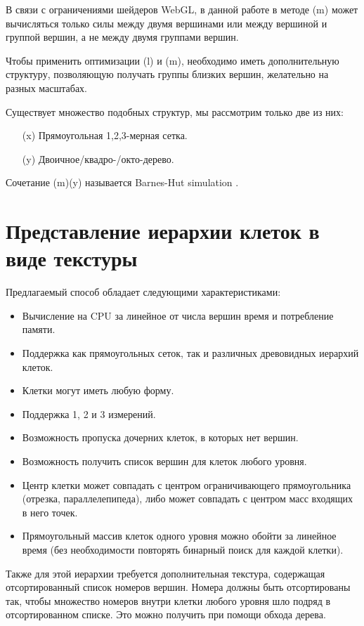 В связи с ограничениями шейдеров WebGL, в данной работе в методе (m) может вычисляться только силы между двумя вершинами или между вершиной и группой вершин, а не между двумя группами вершин.

Чтобы применить оптимизации (l) и (m), необходимо иметь дополнительную структуру, позволяющую получать группы близких вершин, желательно на разных масштабах.

Существует множество подобных структур, мы рассмотрим только две из них:

\begin{itemize}
\item[(x)] Прямоугольная 1,2,3-мерная сетка.
\item[(y)] Двоичное/квадро-/окто-дерево.
\end{itemize}

Сочетание (m)(y) называется Barnes-Hut simulation \cite{barnes_hut}.

\section{Представление иерархии клеток в виде текстуры}

\label{sec:struct_texture}

Предлагаемый способ обладает следующими характеристиками:

\begin{itemize}
\item Вычисление на CPU за линейное от числа вершин время и потребление памяти.
\item Поддержка как прямоугольных сеток, так и различных древовидных иерархий клеток.
\item Клетки могут иметь любую форму.
\item Поддержка 1, 2 и 3 измерений.
\item Возможность пропуска дочерних клеток, в которых нет вершин.
\item Возможность получить список вершин для клеток любого уровня.
\item Центр клетки может совпадать с центром ограничивающего прямоугольника (отрезка, параллелепипеда), либо может совпадать с центром масс входящих в него точек.
\item Прямоугольный массив клеток одного уровня можно обойти за линейное время (без необходимости повторять бинарный поиск для каждой клетки).
\end{itemize}

Также для этой иерархии требуется дополнительная текстура, содержащая отсортированный список номеров вершин. Номера должны быть отсортированы так, чтобы множество номеров внутри клетки любого уровня шло подряд в отсортированном списке. Это можно получить при помощи обхода дерева.

